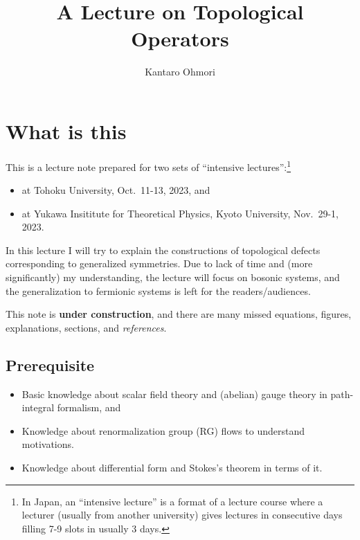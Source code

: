 \documentclass[11pt,toc=bibliography]{scrbook}
\title{A Lecture on Topological Operators}
\author[1]{Kantaro Ohmori}
\affil[1]{Department of Physics, The University of Tokyo, Bunkyo-ku, Tokyo 113-0033, Japan}
\date{}
\numberwithin{equation}{section}
\providecommand{\tightlist}{%
  \setlength{\itemsep}{0pt}\setlength{\parskip}{0pt}}
\begin{document}
\maketitle

\renewcommand*\contentsname{Table of contents}
{
\hypersetup{linkcolor=}
\setcounter{tocdepth}{2}
\tableofcontents
}

\chapter*{What is this}\label{what-is-this}


This is a lecture note prepared for two sets of ``intensive
lectures'':\footnote{In Japan, an ``intensive lecture'' is a format of a
  lecture course where a lecturer (usually from another university)
  gives lectures in consecutive days filling 7-9 slots in usually 3
  days.}

\begin{itemize}
\tightlist
\item
  at Tohoku University, Oct.~11-13, 2023, and
\item
  at Yukawa Insititute for Theoretical Physics, Kyoto University,
  Nov.~29-1, 2023.
\end{itemize}

In this lecture I will try to explain the constructions of topological
defects corresponding to generalized symmetries. Due to lack of time and
(more significantly) my understanding, the lecture will focus on bosonic
systems, and the generalization to fermionic systems is left for the
readers/audiences.

\begin{warning}{}
  This note is \textbf{under construction}, and there are many missed
equations, figures, explanations, sections, and \emph{references}.

\end{warning}

\section*{Prerequisite}\label{prerequisite}


\begin{itemize}
\tightlist
\item
  Basic knowledge about scalar field theory and (abelian) gauge theory
  in path-integral formalism, and
\item
  Knowledge about renormalization group (RG) flows to understand
  motivations.
\item
  Knowledge about differential form and Stokes's theorem in terms of it.
\end{itemize}
\end{document}
